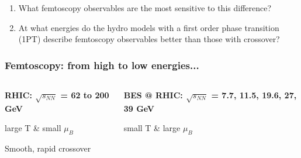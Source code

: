 \documentclass[dvipsnames] {beamer}
\begin{document}
\begin{frame}
{      \begin{enumerate}
      	\item What femtoscopy observables are the most sensitive to this difference?
        \item At what energies do the hydro models with a first order phase transition (1PT) describe femtoscopy observables better than those with crossover?
      \end{enumerate}
  }
\end{frame}

\begin{frame}
  \bf
  \frametitle{Femtoscopy: from high to low energies...}
  \begin{columns}
    \begin{block}{}
      \footnotesize{
        \begin{center}
          \bf
          RHIC: $\sqrt{s_{NN}}$ = 62 to 200 GeV
          
          \vspace{0.15cm}
          
          \alert {large T \& small $\mu_{B}$}

          \vspace{0.15cm}
          

          \vspace{0.15cm}
          
          \alert {Smooth, rapid crossover}

        \end{center}
      }
    \end{block}
    
    \begin{block}{}
      \footnotesize{
        \begin{center}
          \bf
         BES @ RHIC: $\sqrt{s_{NN}}$ = 7.7, 11.5, 19.6, 27, 39 GeV

        \vspace{0.2cm}
        
        \alert {small T \& large $\mu_{B}$}

        \vspace{0.15cm}
        

        \vspace{0.15cm}
      

\end{center}}
\end{block}
\end{columns}
\end{frame}
\end{document}
